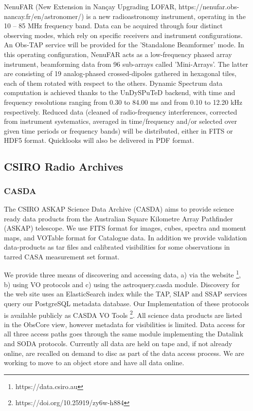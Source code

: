 \documentclass[11pt,a4paper]{ivoa}
\begin{document}
NenuFAR (New Extension in Nançay Upgrading LOFAR, https://nenufar.obs-nancay.fr/en/astronomer/) is a new radioastronomy instrument, operating in the 10 – 85 MHz frequency band. Data can be acquired through four distinct observing modes, which rely on specific receivers and instrument configurations. An Obs-TAP service will be provided for the 'Standalone Beamformer' mode. In this operating configuration, NenuFAR acts as a low-frequency phased array instrument, beamforming data from 96 sub-arrays called 'Mini-Arrays'. The latter are consisting of 19 analog-phased crossed-dipoles gathered in hexagonal tiles, each of them rotated with respect to the others. Dynamic Spectrum data computation is achieved thanks to the UnDySPuTeD backend, with time and frequency resolutions ranging from 0.30 to 84.00 ms and from 0.10 to 12.20 kHz respectively. Reduced data (cleaned of radio-frequency interferences, corrected from instrument systematics, averaged in time/frequency and/or selected over given time periods or frequency bands) will be distributed, either in FITS or HDF5 format. Quicklooks will also be delivered in PDF format.

\subsection{CSIRO Radio Archives}\label{sec:CASDA}

\subsubsection{CASDA}

The CSIRO ASKAP Science Data Archive (CASDA) aims to provide science ready data products from the Australian Square Kilometre Array Pathfinder (ASKAP) telescope. 
We use FITS format for images, cubes, spectra and moment maps, and VOTable format for Catalogue data. 
In addition we provide validation data-products as tar files and calibrated visibilities for some observations in tarred CASA measurement set format.

We provide three means of discovering and accessing data, a) via the website \footnote{https://data.csiro.au}, b) using VO protocols and c) using the astroquery.casda module. 
Discovery for the web site uses an ElasticSearch index while the TAP, SIAP and SSAP services query our PostgreSQL metadata database. 
Our Implementation of these protocols is available publicly as CASDA VO Tools \footnote{https://doi.org/10.25919/zy6w-h884}.
All science data products are listed in the ObsCore view, however metadata for visibilities is limited. 
Data access for all three access paths goes through the same module implementing the Datalink and SODA protocols. 
Currently all data are held on tape and, if not already online, are recalled on demand to disc as part of the data access process. 
We are working to move to an object store and have all data online.
\end{document}
